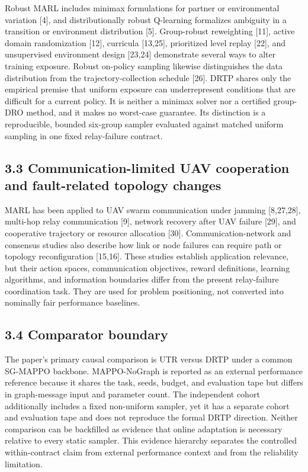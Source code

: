 Robust MARL includes minimax formulations for partner or environmental variation [4], and distributionally robust Q-learning formalizes ambiguity in a transition or environment distribution [5]. Group-robust reweighting [11], active domain randomization [12], curricula [13,25], prioritized level replay [22], and unsupervised environment design [23,24] demonstrate several ways to alter training exposure. Robust on-policy sampling likewise distinguishes the data distribution from the trajectory-collection schedule [26]. DRTP shares only the empirical premise that uniform exposure can underrepresent conditions that are difficult for a current policy. It is neither a minimax solver nor a certified group-DRO method, and it makes no worst-case guarantee. Its distinction is a reproducible, bounded six-group sampler evaluated against matched uniform sampling in one fixed relay-failure contract.

\subsection{3.3 Communication-limited UAV cooperation and fault-related topology changes}

MARL has been applied to UAV swarm communication under jamming [8,27,28], multi-hop relay communication [9], network recovery after UAV failure [29], and cooperative trajectory or resource allocation [30]. Communication-network and consensus studies also describe how link or node failures can require path or topology reconfiguration [15,16]. These studies establish application relevance, but their action spaces, communication objectives, reward definitions, learning algorithms, and information boundaries differ from the present relay-failure coordination task. They are used for problem positioning, not converted into nominally fair performance baselines.

\subsection{3.4 Comparator boundary}

The paper's primary causal comparison is UTR versus DRTP under a common SG-MAPPO backbone. MAPPO-NoGraph is reported as an external performance reference because it shares the task, seeds, budget, and evaluation tape but differs in graph-message input and parameter count. The independent cohort additionally includes a fixed non-uniform sampler, yet it has a separate cohort and evaluation tape and does not reproduce the formal DRTP direction. Neither comparison can be backfilled as evidence that online adaptation is necessary relative to every static sampler. This evidence hierarchy separates the controlled within-contract claim from external performance context and from the reliability limitation.